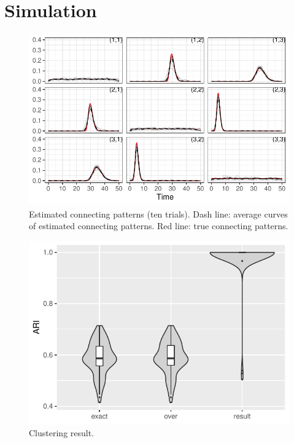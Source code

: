 
\section{Simulation} \label{sec:simulation}


\begin{figure}[H]
\includegraphics[width=\textwidth]{../simulation/plots/conn_pattern}
\caption{ Estimated connecting patterns (ten trials). Dash line: average curves of estimated connecting patterns. Red line: true connecting patterns.}
\end{figure}



\begin{figure}[H]
\includegraphics[width=.8\textwidth]{../simulation/plots/violin_cmpr}
\caption{Clustering result.}
\end{figure}


